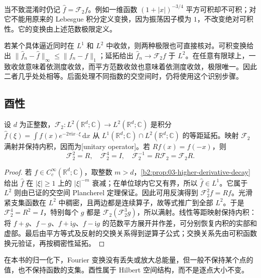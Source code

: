 当不致混淆时仍记 \(\widehat f=\mathcal F_2f\)。例如一维函数 \((1+|x|)^{-3/4}\) 平方可积却不可积；对它不能用原来的 Lebesgue 积分定义变换，因为振荡因子模为 \(1\)，不改变绝对可积性。它的变换由上述范数极限定义。

\ProseParagraphBreak

若某个具体逼近同时在 \(L^1\) 和 \(L^2\) 中收敛，则两种极限也可直接核对。可积变换给出 \(\|\widehat f_n-\widehat f\|_\infty\leq\|f_n-f\|_1\)；延拓给出 \(\widehat f_n\to\mathcal F_2f\) 于 \(L^2\)。在任意有限球上，一致收敛意味着依测度收敛，而平方范数收敛也意味着依测度收敛，极限唯一。因此二者几乎处处相等。后面处理不同指数的交空间时，仍将使用这个识别步骤。

\subsection{酉性}
\label{b2:subsec:040103}

\begin{theorem}\label{b2:thm:04-unitary}
设 \(d\) 为正整数，\(\mathcal F_2:L^2(\mathbb R^d;\mathbb C)\to L^2(\mathbb R^d;\mathbb C)\) 是积分 \(\widehat f(\xi)=\int f(x)e^{-2\pi\mathrm ix\cdot\xi}\,\mathrm dx\) 从 \(L^1(\mathbb R^d;\mathbb C)\cap L^2(\mathbb R^d;\mathbb C)\) 的等距延拓。映射 \(\mathcal F_2\) 满射并保持内积，因而为[unitary operator]。若 \(Rf(x)=f(-x)\)，则
\[
 \mathcal F_2^2=R,\quad \mathcal F_2^4=I,
 \quad \mathcal F_2^{-1}=R\mathcal F_2=\mathcal F_2R.
\]
\end{theorem}
\begin{proof}
若 \(f\in C_c^\infty(\mathbb R^d;\mathbb C)\)，取整数 \(m>d\)，\cref{b2:prop:03-higher-derivative-decay}给出 \(\widehat f\) 在 \(|\xi|\geq1\) 上的 \(|\xi|^{-m}\) 衰减；在单位球内它又有界，所以 \(\widehat f\in L^1\)。它属于 \(L^2\) 则由已证的交空间 Plancherel 定理保证。因此可用反演得到 \(\mathcal F_2^2f=Rf\)。光滑紧支集函数在 \(L^2\) 中稠密，且两边都是连续算子，故等式推广到全部 \(L^2\)。于是 \(\mathcal F_2^4=R^2=I\)，特别每个 \(g\) 都是 \(\mathcal F_2(\mathcal F_2^3g)\)，所以满射。线性等距映射保持内积：将 \(f+g\)、\(f-g\)、\(f+\mathrm{i}g\)、\(f-\mathrm{i}g\) 的范数平方展开并作差，可分别恢复内积的实部和虚部。最后由平方等式及反射的交换关系得到逆算子公式；交换关系先由可积函数换元验证，再按稠密性延拓。
\end{proof}

在本书的归一化下，Fourier 变换没有丢失或放大总能量，但一般不保持某个点的值，也不保持函数的支集。酉性属于 Hilbert 空间结构，而不是逐点大小不变。

